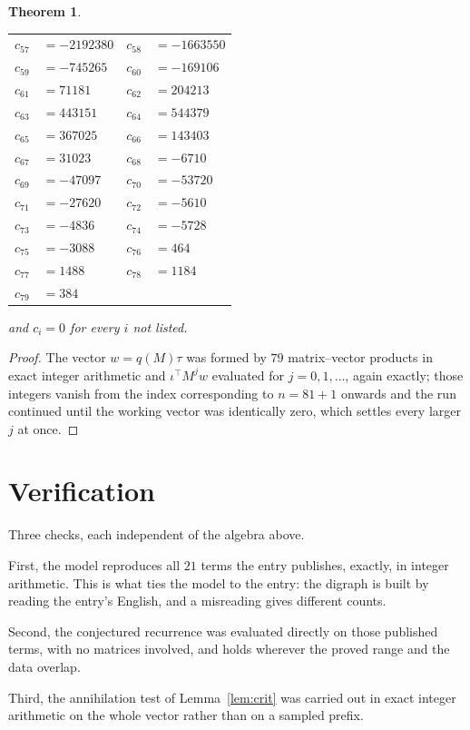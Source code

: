 \documentclass[11pt,a4paper]{article}
\theoremstyle{plain}
\newtheorem{theorem}{Theorem}
\theoremstyle{definition}
\begin{document}
\begin{theorem}
\begin{center}
\begin{tabular}{r@{\,}l@{\qquad}r@{\,}l}
$c_{57}$ & $=-2192380$ & $c_{58}$ & $=-1663550$ \\
$c_{59}$ & $=-745265$ & $c_{60}$ & $=-169106$ \\
$c_{61}$ & $=71181$ & $c_{62}$ & $=204213$ \\
$c_{63}$ & $=443151$ & $c_{64}$ & $=544379$ \\
$c_{65}$ & $=367025$ & $c_{66}$ & $=143403$ \\
$c_{67}$ & $=31023$ & $c_{68}$ & $=-6710$ \\
$c_{69}$ & $=-47097$ & $c_{70}$ & $=-53720$ \\
$c_{71}$ & $=-27620$ & $c_{72}$ & $=-5610$ \\
$c_{73}$ & $=-4836$ & $c_{74}$ & $=-5728$ \\
$c_{75}$ & $=-3088$ & $c_{76}$ & $=464$ \\
$c_{77}$ & $=1488$ & $c_{78}$ & $=1184$ \\
$c_{79}$ & $=384$ \\
\end{tabular}
\end{center}
and $c_i=0$ for every $i$ not listed.
\end{theorem}

\begin{proof}
The vector $w=q(M)\tau$ was formed by $79$ matrix--vector products in exact integer
arithmetic and $\iota^{\!\top}M^{j}w$ evaluated for $j=0,1,\dots$, again exactly; those
integers vanish from the index corresponding to $n=81+1$ onwards and the run continued
until the working vector was identically zero, which settles every larger $j$ at once.
\end{proof}

\section{Verification}

Three checks, each independent of the algebra above.

First, the model reproduces all $21$ terms the entry publishes, exactly, in integer
arithmetic. This is what ties the model to the entry: the digraph is built by reading the
entry's English, and a misreading gives different counts.

Second, the conjectured recurrence was evaluated directly on those published terms, with no
matrices involved, and holds wherever the proved range and the data overlap.

Third, the annihilation test of Lemma~\ref{lem:crit} was carried out in exact integer
arithmetic on the whole vector rather than on a sampled prefix.
\end{document}
